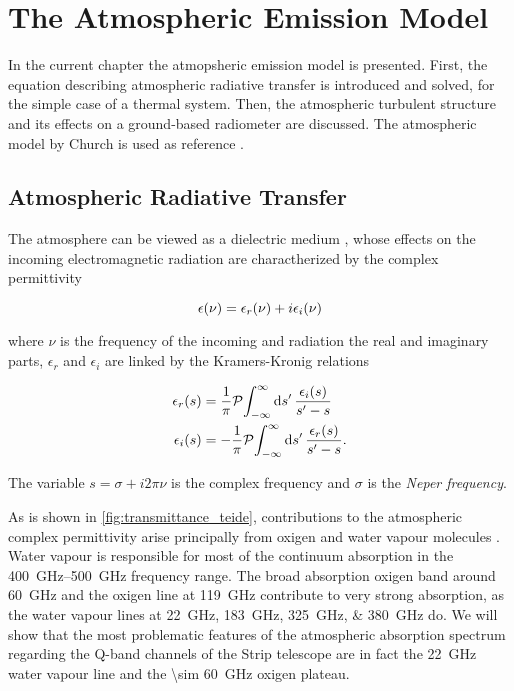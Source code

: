 \chapter{The Atmospheric Emission Model}\label{ch:atm_model}

In the current chapter the atmopsheric emission model is presented. First,
the equation describing atmospheric radiative transfer is introduced and
solved, for the simple case of a thermal system. Then, the atmospheric
turbulent structure and its effects on a ground-based radiometer are
discussed. The atmospheric model by Church is used as reference
\autocite{church1995predicting}.

\section{Atmospheric Radiative Transfer}

The atmosphere can be viewed as a dielectric medium
\autocite{church1995predicting}, whose effects on the incoming
electromagnetic radiation are charactherized by the complex permittivity

\begin{equation}
        \epsilon\qty(\nu) = \epsilon_r\qty(\nu) + i\epsilon_i\qty(\nu)
\end{equation}

where $\nu$ is the frequency of the incoming and radiation the real and
imaginary parts, $\epsilon_r$ and $\epsilon_i$ are linked by the
Kramers-Kronig relations

\begin{align}
        \epsilon_r\qty(s) & = \frac{1}{\pi}
        \principalvalue{\int^\infty_{-\infty}\dd{s'}
        \frac{\epsilon_i\qty(s)}{s' - s}} \label{eq:kk_relations_1} \\
        \epsilon_i\qty(s) & = -\frac{1}{\pi}
        \principalvalue{\int^\infty_{-\infty}\dd{s'}
        \frac{\epsilon_r\qty(s)}{s' - s}} \label{eq:kk_relations_2}.
\end{align}

The variable $s = \sigma + i 2\pi\nu$ is the complex frequency and $\sigma$
is the \emph{Neper frequency}.

As is shown in \autoref{fig:transmittance_teide}, contributions to the
atmospheric complex permittivity arise principally from oxigen and water
vapour molecules \autocite{errard2015modeling}. Water vapour is responsible
for most of the continuum absorption in the \SIrange{400}{500}{\giga\hertz}
frequency range. The broad absorption oxigen band around
\SI{60}{\giga\hertz} and the oxigen line at \SI{119}{\giga\hertz}
contribute to very strong absorption, as the water vapour lines at
\SIlist{22;183;325;380}{\giga\hertz} do. We will show that the most
problematic features of the atmospheric absorption spectrum regarding the
Q-band channels of the Strip telescope are in fact the \SI{22}{\giga\hertz}
water vapour line and the \SI{\sim 60}{\giga\hertz} oxigen plateau.

